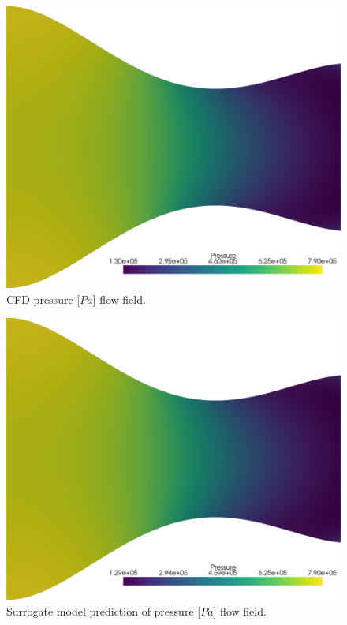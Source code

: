 \documentclass[10pt,oneside,a4paper,twocolumn]{article}
\begin{document}
\begin{figure}[htbp]
  \centering
  \includegraphics[width=0.8\columnwidth]{figures/Pressure_field_cfd.png}
  \caption{CFD pressure [$Pa$] flow field.}
  \label{fig:cfd_pressure}
\end{figure}

\begin{figure}[htbp]
  \centering
  \includegraphics[width=0.8\columnwidth]{figures/Pressure_field_reconstructed.png}
  \caption{Surrogate model prediction of pressure [$Pa$] flow field.}
  \label{fig:prediction_pressure}
\end{figure}
\end{document}
